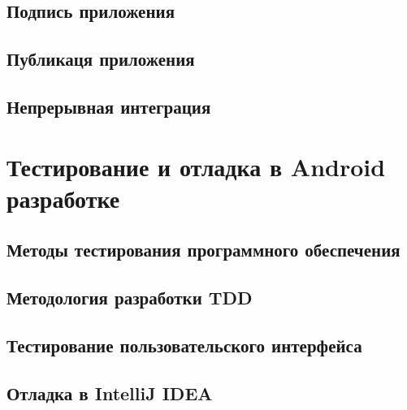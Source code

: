 \subsection{Подпись приложения}
\label{subsec:signing}

\subsection{Публикаця приложения}
\label{subsec:publish}

\subsection{Непрерывная интеграция}
\label{subsec:ci}


\section{Тестирование и отладка в Android разработке}
\label{sec:testing}

\subsection{Методы тестирования программного обеспечения}
\label{subsec:testing:methods}

\subsection{Методология разработки TDD}
\label{subsec:testing:tdd}

\subsection{Тестирование пользовательского интерфейса}
\label{subsec:testing:ui}

\subsection{Отладка в IntelliJ IDEA}
\label{subsec:debug}
